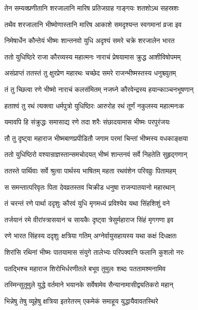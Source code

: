 \twolineshloka
{तेन सम्यक्प्रणीतानि शरजालानि मारिष}
{प्रतिजग्राह गाङ्गयः शतशोऽथ सहस्रशः}


\twolineshloka
{तथैव शरजालानि भीष्मोणास्तानि मारिष}
{आकाशे समदृश्यन्त स्वगमानां व्रजा इव}


\twolineshloka
{निमेषार्धेन कौन्तेयं भीष्मः शान्तनवो युधि}
{अदृश्यं समरे चक्रे शरजालेन भारत}


\twolineshloka
{ततो युधिष्ठिरे राजा कौरव्यस्य महात्मनः}
{नाराचं प्रेषयामास क्रुद्ध आशीविषोपमम्}


\twolineshloka
{असंप्राप्तं ततस्तं तु क्षुरप्रेण महारथः}
{चच्छेद समरे राजन्भीष्मस्तस्य धनुश्च्युतम्}


\twolineshloka
{तं तु च्छित्वा रणे भीष्मो नाराचं कलसंमितम्}
{नजघ्ने कौरवेन्द्रस्य हयान्काञ्चनभूषणान्}


\twolineshloka
{हताश्वं तु रथं त्यक्त्वा धर्मपुत्रो युधिष्ठिरः}
{आरुरोह रथं तूर्णं नकुलस्य महात्मनःक}


\twolineshloka
{यमावपि हि संक्रुद्धः समासाद्य रणे तदा}
{शरैः संछादयामास भीष्मः परपुरंजयः}


\twolineshloka
{तौ तु दृष्ट्वा महाराज भीष्मबाणप्रपीडितौ}
{जगाम परमां चिन्तां भीष्मस्य वधकाङ्क्षया}


\twolineshloka
{ततो युधिष्ठिरो वश्यान्राज्ञस्तान्समचोदयत्}
{भीष्मं शान्तनवं सर्वे निहतेति सुहृद्गणान्}


\twolineshloka
{ततस्ते पार्थिवाः सर्वे श्रुत्वा पार्थस्य भाषितम्}
{महता रथवंशेन परिवव्रुः पितामहम्}


\twolineshloka
{स समन्तात्परिवृतः पिता देवव्रतस्तव}
{चिक्रीड धनुषा राजन्पातयानो महारथान्}


\twolineshloka
{तं चरन्तं रणे पार्था ददृशुः कौरवं युधि}
{मृगमध्यं प्रविश्येव यथा सिंहशिशुं वने}


\twolineshloka
{तर्जयानं रमे वीरांस्त्रासयानं च सायकैः}
{दृष्ट्वा त्रेसुर्महाराज सिंहं मृगगणा इव}


\twolineshloka
{रणे भारत सिंहस्य ददृशुः क्षत्रिया गतिम्}
{अग्नेर्वायुसहायस्य यथा कक्षं दिधक्षतः}


\twolineshloka
{शिरांसि रथिनां भीष्मः पातयामास संयुगे}
{तालेभ्यः परिपक्वानि फलानि कुशलो नरः}


\twolineshloka
{पतद्भिश्च महाराज शिरोभिर्धरणीतले}
{बभूव तुमुलः शब्दः पततामश्मनामिव}


\twolineshloka
{तस्मिन्सुतुमुले युद्धे वर्तमाने भयानके}
{सर्वेषामेव सैन्यानामासीद्व्यतिकरो महान्}


\twolineshloka
{भिन्नेषु तेषु व्यूहेषु क्षत्रिया इतरेतरम्}
{एकमेकं समाहूय युद्धायैवावतस्थिरे}


